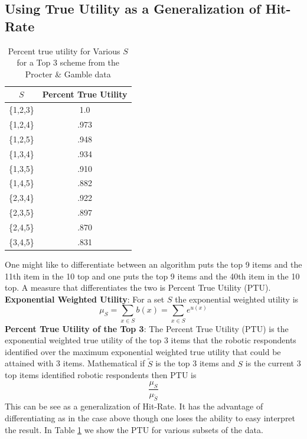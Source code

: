 \documentclass[nonblindrev]{informs3}
\begin{document}
\subsection{Using True Utility as a Generalization of Hit-Rate}
\begin{table}
\begin{center}
\begin{tabular}{c | c }
$S$& Percent True Utility \\
\hline
\{1,2,3\}& 1.0 \\
\{1,2,4\}&.973 \\
\{1,2,5\}&.948 \\
\{1,3,4\}&.934 \\
\{1,3,5\}&.910 \\
\{1,4,5\}&.882 \\
\{2,3,4\}&.922 \\
\{2,3,5\}&.897 \\
\{2,4,5\}&.870 \\
\{3,4,5\}&.831 \\
\hline
\end{tabular}
\end{center}
\caption{Percent true utility for Various $S$ for a Top 3 scheme from the Procter \& Gamble data}
\label{table:PTU}
\end{table}
One might like to differentiate between an algorithm puts the top 9 items and the 11th item in the 10 top and one puts the top 9 items and the 40th item in the 10 top. A measure that differentiates the two is Percent True Utility (PTU). \\
\textbf{Exponential Weighted Utility}: For a set $S$ the exponential weighted utility is \[\mu_S=\sum_{x \in S}b(x)=\sum_{x \in S}e^{u(x)}\]
\textbf{Percent True Utility of the Top 3}: The Percent True Utility (PTU) is the exponential weighted true utility of the top 3 items that the robotic respondents identified over the maximum exponential weighted true utility that could be attained with 3 items. Mathematical if $\tilde{S}$ is the top 3 items and $S$ is the current 3 top items identified robotic respondents then PTU is 
\[
\frac{\mu_S}{\mu_{\tilde{S}}}
\]
This can be see as a generalization of Hit-Rate. It has the advantage of differentiating as in the case above though one loses the ability to easy interpret the result. In Table \ref{table:PTU} we show the PTU for various subsets of the data.
\end{document}
